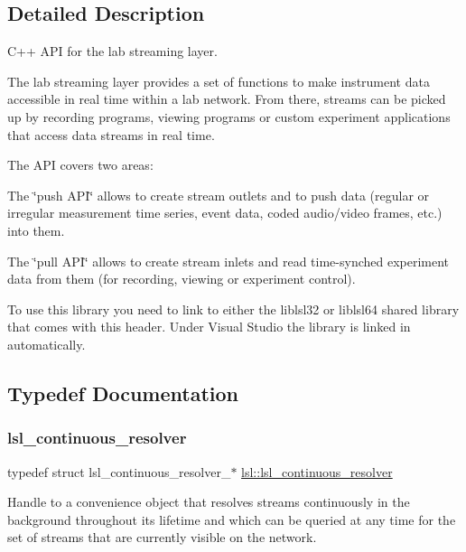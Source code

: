 \subsection{Detailed Description}
C++ A\+PI for the lab streaming layer.

The lab streaming layer provides a set of functions to make instrument data accessible in real time within a lab network. From there, streams can be picked up by recording programs, viewing programs or custom experiment applications that access data streams in real time.

The A\+PI covers two areas\+:
\begin{DoxyItemize}
\item The \char`\"{}push A\+P\+I\char`\"{} allows to create stream outlets and to push data (regular or irregular measurement time series, event data, coded audio/video frames, etc.) into them.
\item The \char`\"{}pull A\+P\+I\char`\"{} allows to create stream inlets and read time-\/synched experiment data from them (for recording, viewing or experiment control).
\end{DoxyItemize}

To use this library you need to link to either the liblsl32 or liblsl64 shared library that comes with this header. Under Visual Studio the library is linked in automatically. 

\subsection{Typedef Documentation}
\mbox{\label{namespacelsl_ab09ea0488f986f056322c3c866dc0a0f}} 
\subsubsection{\texorpdfstring{lsl\+\_\+continuous\+\_\+resolver}{lsl\_continuous\_resolver}}
{\footnotesize\ttfamily typedef struct lsl\+\_\+continuous\+\_\+resolver\+\_\+$\ast$ \hyperlink{namespacelsl_ab09ea0488f986f056322c3c866dc0a0f}{lsl\+::lsl\+\_\+continuous\+\_\+resolver}}

Handle to a convenience object that resolves streams continuously in the background throughout its lifetime and which can be queried at any time for the set of streams that are currently visible on the network. \mbox{\label{namespacelsl_a884a3363cfcba75d7ce8f00c1c4c54f1}} 
